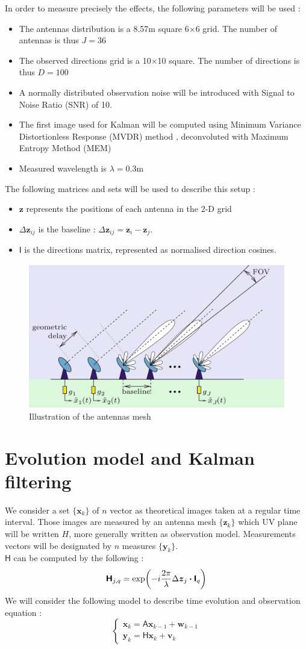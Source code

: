 \documentclass[titlepage]{article}
\newcommand{\w}{\boldsymbol{w}}
\renewcommand{\v}{\boldsymbol{v}}
\renewcommand{\H}{\boldsymbol{\mathsf{H}}}
\newcommand{\A}{\boldsymbol{\mathsf{A}}}
\newcommand{\I}{\boldsymbol{\mathsf{I}}}
\newcommand{\x}{\boldsymbol{x}}
\newcommand{\y}{\boldsymbol{y}}
\newcommand{\z}{\boldsymbol{z}}
\newcommand{\dz}{\Delta\boldsymbol{z}}
\begin{document}
	In order to measure precisely the effects, the following parameters will be used :
	\begin{itemize}
		\item The antennas distribution is a 8.57m square 6$\times$6 grid. The number of antennas is thus $J = 36$
		\item The observed directions grid is a 10$\times$10 square. The number of directions is thus $D=100$
		\item A normally distributed observation noise will be introduced with Signal to Noise Ratio (SNR) of 10. 
		\item The first image used for Kalman will be computed using Minimum Variance Distortionless Response (MVDR) method \cite{bible}, deconvoluted with Maximum Entropy Method (MEM) \cite{MEM}
		\item Measured wavelength is $\lambda =0.3$m
	\end{itemize}

	The following matrices and sets will be used to describe this setup :
	\begin{itemize}
		\item $\z$ represents the positions of each antenna in the 2-D grid
		\item $\dz_{ij}$ is the baseline : $\dz_{ij} = \z_i - \z_j$. 
		\item $\I$ is the directions matrix, represented as normalised direction cosines.
	\end{itemize}

	\begin{figure}[H]
		\centering
		\includegraphics[width=.5\linewidth]{src/antennes}
		\caption{Illustration of the antennas mesh}
	\end{figure}
		
	\section{Evolution model and Kalman filtering}
	
	We consider a set $\{\x_k\}$ of $n$ vector as theoretical images taken at a regular time interval. Those images are measured by an antenna mesh $\{\z_k\}$ which UV plane will be written $H$, more generally written as observation model. Measurements vectors will be designated by $n$ measures $\{\y_k\}$.\\
	$\H$ can be computed by the following :
	\begin{equation}
		\H_{j,q} = \exp(-i\frac{2\pi}{\lambda}\dz_{j}\dotproduct\I_q)
	\end{equation}
	We will consider the following model to describe time evolution and observation equation :
	$$
		\begin{cases}
			\x_k = \A\x_{k-1} + \w_{k-1}\\
			\y_k = \H\x_k + \v_k
		\end{cases}
	$$
	
\end{document}
